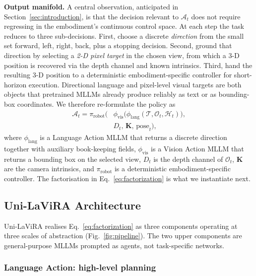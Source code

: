 \documentclass[conference]{IEEEtran}
\newcommand{\ourmethod}{Uni-LaViRA\xspace}
\begin{document}
\textbf{Output manifold.} A central observation, anticipated in
Section~\ref{sec:introduction}, is that the decision relevant to
$\mathcal{A}_t$ does not require regressing in the embodiment's continuous
control space. At each step the task reduces to three sub-decisions. First,
choose a discrete \emph{direction} from the small set forward, left, right,
back, plus a stopping decision. Second, ground that direction by selecting a
\emph{2-D pixel target} in the chosen view, from which a 3-D position is
recovered via the depth channel and known intrinsics. Third, hand the
resulting 3-D position to a deterministic embodiment-specific controller for
short-horizon execution. Directional language and pixel-level visual targets
are both objects that pretrained MLLMs already produce reliably as text or as
bounding-box coordinates. We therefore re-formulate the policy as
\begin{equation}
\begin{aligned}
\mathcal{A}_t = \pi_{\mathrm{robot}}\Big(
  &\phi_{\mathrm{vis}}\big(
    \phi_{\mathrm{lang}}(\mathcal{T},\mathcal{O}_t,\mathcal{H}_t)\big),\\
  &D_t,\,\mathbf{K},\,\mathrm{pose}_t\Big),
\end{aligned}
\label{eq:factorization}
\end{equation}
where $\phi_{\mathrm{lang}}$ is a Language Action MLLM that returns a discrete
direction together with auxiliary book-keeping fields, $\phi_{\mathrm{vis}}$
is a Vision Action MLLM that returns a bounding box on the selected view,
$D_t$ is the depth channel of $\mathcal{O}_t$, $\mathbf{K}$ are the camera
intrinsics, and $\pi_{\mathrm{robot}}$ is a deterministic embodiment-specific
controller. The factorisation in Eq.~\ref{eq:factorization} is what we
instantiate next.

\subsection{\ourmethod Architecture}
\label{subsec:architecture}

\ourmethod realises Eq.~\ref{eq:factorization} as three components operating
at three scales of abstraction (Fig.~\ref{fig:pipeline}). The two upper
components are general-purpose MLLMs prompted as agents, not task-specific
networks.

\subsubsection{Language Action: high-level planning}
\end{document}
